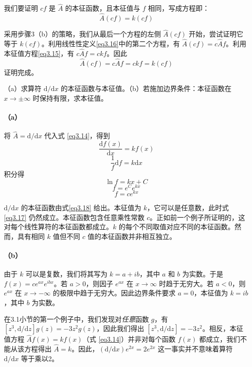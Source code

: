 \documentclass[12pt,a4paper,openany]{ctexbook}
\begin{document}
\begin{flushleft}
\begin{examplebox}
我们要证明 \(cf\) 是 \(\hat{A}\) 的本征函数，且本征值与 \(f\) 相同，写成方程即：
\[
\hat{A}(cf) = k(cf)
\]

采用步骤3（b）的策略，我们从最后一个方程的左侧 \(\hat{A}(cf)\) 开始，尝试证明它等于 \(k(cf)\)。利用线性性定义\eqref{eq3.16}中的第二个方程，有 \(\hat{A}(cf) = c\hat{A}f\)。利用本征值方程\eqref{eq3.15}，有 \(c\hat{A}f = ckf\)。因此
\[
\hat{A}(cf) = c\hat{A}f = ckf = k(cf)
\]
证明完成。
\end{examplebox}

\begin{examplebox}
    \setlength{\parindent}{2em}
（a）求算符 \(\mathrm{d}/\mathrm{d}x\) 的本征函数与本征值。（b）若施加边界条件：本征函数在 \(x \to \pm\infty\) 时保持有限，求本征值。

\paragraph{（a）}将 \(\hat{A} = \mathrm{d}/\mathrm{d}x\) 代入式 \eqref{eq3.14}，得到
\begin{equation}
    \frac{\mathrm{d}f(x)}{\mathrm{d}x} = kf(x)
    \label{eq3.17}
\end{equation}
\[
\frac{1}{f}\mathrm{d}f = k\mathrm{d}x
\]
积分得
\[
\ln f = kx + C
\]
\[
f = e^Ce^{kx}
\]
\begin{equation}
    f = ce^{kx}
    \label{eq3.18}
\end{equation}

\(\mathrm{d}/\mathrm{d}x\) 的本征函数由式\eqref{eq3.18} 给出。本征值为 \(k\)，它可以是任意数，此时式 \eqref{eq3.17} 仍然成立。本征函数包含任意乘性常数 \(c\)。正如前一个例子所证明的，这对每个线性算符的本征函数都成立。\(k\) 的每个不同取值对应不同的本征函数。然而，具有相同 \(k\) 值但不同 \(c\) 值的本征函数并非相互独立。

\paragraph{（b）}由于 \(k\) 可以是复数，我们将其写为 \(k = a + ib\)，其中 \(a\) 和 \(b\) 为实数。于是 \(f(x) = ce^{ax}e^{ibx}\)。若 \(a > 0\)，则因子 \(e^{ax}\) 在 \(x \to \infty\) 时趋于无穷大。若 \(a < 0\)，则 \(e^{ax}\) 在 \(x \to -\infty\) 的极限中趋于无穷大。因此边界条件要求 \(a = 0\)，本征值为 \(k = ib\)，其中 \(b\) 为实数。
\end{examplebox}

在3.1小节的第一个例子中，我们发现对\textit{任意}函数 \(g\)，有 \([z^3, \mathrm{d}/\mathrm{d}z]g(z) = -3z^2g(z)\)，因此我们得出 \([z^3, \mathrm{d}/\mathrm{d}z] = -3z^2\)。相反，本征值方程 \(\hat{A}f(x) = kf(x)\)（式 \eqref{eq3.14}）并非对每个函数 \(f(x)\) 都成立，我们不能从该方程得出 \(\hat{A} = k\)。因此，\((\mathrm{d}/\mathrm{d}x)e^{2x} = 2e^{2x}\) 这一事实并不意味着算符 \(\mathrm{d}/\mathrm{d}x\) 等于乘以2。
\end{flushleft}
\end{document}
